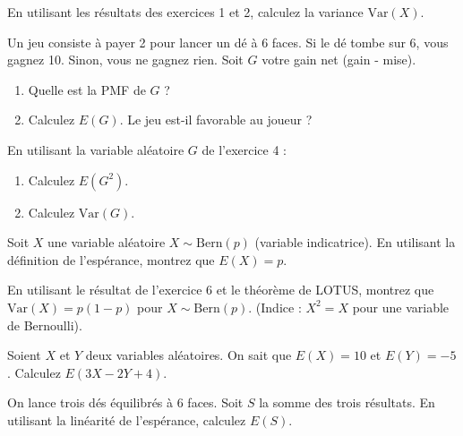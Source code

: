 \begin{exercicebox}
En utilisant les résultats des exercices 1 et 2, calculez la variance $\text{Var}(X)$.
\end{exercicebox}

\begin{exercicebox}
Un jeu consiste à payer 2 pour lancer un dé à 6 faces. Si le dé tombe sur 6, vous gagnez 10. Sinon, vous ne gagnez rien. Soit $G$ votre gain net (gain - mise).
\begin{enumerate}
    \item Quelle est la PMF de $G$ ?
    \item Calculez $E(G)$. Le jeu est-il favorable au joueur ?
\end{enumerate}
\end{exercicebox}

\begin{exercicebox}
En utilisant la variable aléatoire $G$ de l'exercice 4 :
\begin{enumerate}
    \item Calculez $E(G^2)$.
    \item Calculez $\text{Var}(G)$.
\end{enumerate}
\end{exercicebox}

\begin{exercicebox}
Soit $X$ une variable aléatoire $X \sim \text{Bern}(p)$ (variable indicatrice). En utilisant la définition de l'espérance, montrez que $E(X) = p$.
\end{exercicebox}

\begin{exercicebox}
En utilisant le résultat de l'exercice 6 et le théorème de LOTUS, montrez que $\text{Var}(X) = p(1-p)$ pour $X \sim \text{Bern}(p)$. (Indice : $X^2 = X$ pour une variable de Bernoulli).
\end{exercicebox}


\begin{exercicebox}
Soient $X$ et $Y$ deux variables aléatoires. On sait que $E(X) = 10$ et $E(Y) = -5$.
Calculez $E(3X - 2Y + 4)$.
\end{exercicebox}

\begin{exercicebox}
On lance trois dés équilibrés à 6 faces. Soit $S$ la somme des trois résultats.
En utilisant la linéarité de l'espérance, calculez $E(S)$.
\end{exercicebox}

